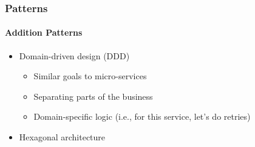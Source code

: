 \begin{frame}[fragile]
  \frametitle{Patterns}
  \framesubtitle{Addition Patterns}

  \begin{itemize}
    \pause
    \item Domain-driven design (DDD)
      \begin{itemize}
        \item Similar goals to micro-services
        \item Separating parts of the business
        \item Domain-specific logic (i.e., for this service, let's do retries)
      \end{itemize}
    \item Hexagonal architecture
  \end{itemize}
\end{frame}


